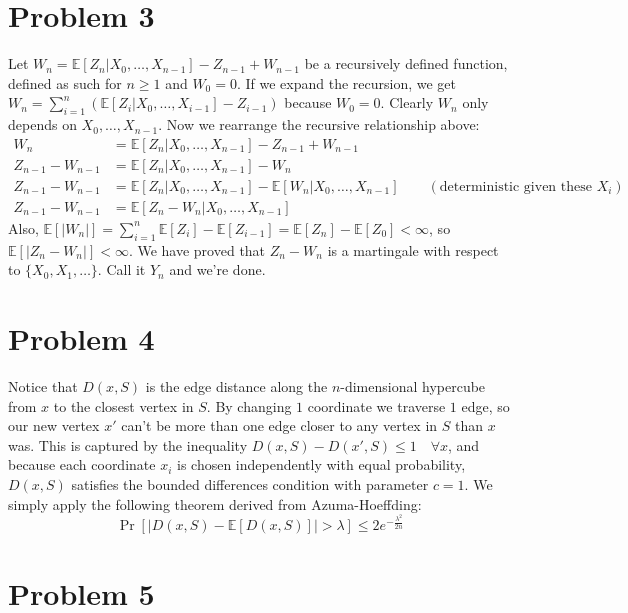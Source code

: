 \documentclass[11pt]{article}
\newcommand{\E}{\mathbb{E}}
\newcommand{\asdf}{\newline\newline}
\begin{document}
\newpage
\section*{Problem 3}
Let $W_n=\E[Z_n|X_0,\ldots,X_{n-1}]-Z_{n-1}+W_{n-1}$ be a recursively defined function, defined as such for $n\geq1$ and $W_0=0$.\asdf
If we expand the recursion, we get $W_n=\sum_{i=1}^n(\E[Z_i|X_0,\ldots,X_{i-1}]-Z_{i-1})$ because $W_0=0$. Clearly $W_n$ only depends on $X_0,\ldots,X_{n-1}$.\asdf
Now we rearrange the recursive relationship above:
\begin{align*}
W_n &= \E[Z_n|X_0,\ldots,X_{n-1}]-Z_{n-1}+W_{n-1}\\
Z_{n-1}-W_{n-1} &= \E[Z_n|X_0,\ldots,X_{n-1}]-W_n\\
Z_{n-1}-W_{n-1} &= \E[Z_n|X_0,\ldots,X_{n-1}]-\E[W_n|X_0,\ldots,X_{n-1}]\qquad (\text{deterministic given these }X_i)\\
Z_{n-1}-W_{n-1} &= \E[Z_n-W_n|X_0,\ldots,X_{n-1}]
\end{align*}
Also, $\E[|W_n|] = \sum_{i=1}^n\E[Z_i]-\E[Z_{i-1}] = \E[Z_n]-\E[Z_0]<\infty$, so $\E[|Z_n-W_n|]<\infty$.\asdf
We have proved that $Z_n-W_n$ is a martingale with respect to $\{X_0,X_1,\ldots\}$. Call it $Y_n$ and we're done.


\newpage
\section*{Problem 4}
Notice that $D(x,S)$ is the edge distance along the $n$-dimensional hypercube from $x$ to the closest vertex in $S$. By changing $1$ coordinate we traverse $1$ edge, so our new vertex $x'$ can't be more than one edge closer to any vertex in $S$ than $x$ was.\asdf
This is captured by the inequality $D(x,S)-D(x',S)\leq 1\quad\forall x$, and because each coordinate $x_i$ is chosen independently with equal probability, $D(x,S)$ satisfies the bounded differences condition with parameter $c=1$. We simply apply the following theorem derived from Azuma-Hoeffding:
$$\Pr[|D(x,S)-\E[D(x,S)]|> \lambda]\leq 2e^{-\frac{\lambda^2}{2n}}$$


\newpage
\section*{Problem 5}


\newpage
\end{document}
